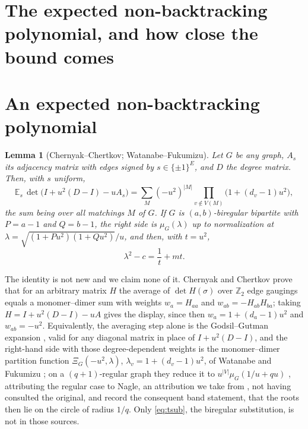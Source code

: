 \documentclass[11pt]{article}
\newtheorem{lemma}[theorem]{Lemma}
\theoremstyle{remark}
\begin{document}
\section{The expected non-backtracking polynomial, and how close the bound comes}

\section{An expected non-backtracking polynomial}

\begin{lemma}[Chernyak--Chertkov; Watanabe--Fukumizu]\label{lem:gauge}
Let $G$ be any graph, $A_s$ its adjacency matrix with edges signed by
$s\in\{\pm1\}^{E}$, and $D$ the degree matrix. Then, with $s$ uniform,
\[
\mathbb E_s\,\det\bigl(I+u^2(D-I)-uA_s\bigr)
=\sum_{M}(-u^2)^{|M|}\prod_{v\notin V(M)}\bigl(1+(d_v-1)u^2\bigr),
\]
the sum being over all matchings $M$ of $G$. If $G$ is $(a,b)$-biregular
bipartite with $P=a-1$ and $Q=b-1$, the right side is $\mu_G(\lambda)$ up to
normalization at $\lambda=\sqrt{(1+Pu^2)(1+Qu^2)}/u$, and then, with $t=u^2$,
\begin{equation}\label{eq:tsub}
\lambda^2-c=\frac1t+mt .
\end{equation}
\end{lemma}

The identity is not new and we claim none of it. Chernyak and Chertkov
\cite[Eqs.~(2),~(6)]{CC} prove that for an arbitrary matrix $H$ the average of
$\det H(\sigma)$ over $\mathbb Z_2$ edge gaugings equals a monomer--dimer sum with
weights $w_a=H_{aa}$ and $w_{ab}=-H_{ab}H_{ba}$; taking $H=I+u^2(D-I)-uA$ gives
the display, since then $w_a=1+(d_a-1)u^2$ and $w_{ab}=-u^2$. Equivalently, the
averaging step alone is the Godsil--Gutman expansion \cite{GG}, valid for any
diagonal matrix in place of $I+u^2(D-I)$, and the right-hand side with those
degree-dependent weights is the monomer--dimer partition function
$\Xi_G(-u^2,\lambda)$, $\lambda_v=1+(d_v-1)u^2$, of Watanabe and Fukumizu
\cite[Thm.~5.5]{WF}; on a $(q+1)$-regular graph they reduce it to
$u^{|V|}\mu_G(1/u+qu)$ \cite[Eq.~(5.3)]{WF}, attributing the regular case to
Nagle, an attribution we take from \cite{WF}, not having consulted the
original, and record the consequent band statement, that the roots then lie on
the
circle of radius $1/q$. Only \eqref{eq:tsub}, the biregular substitution, is not
in those sources.
\end{document}
